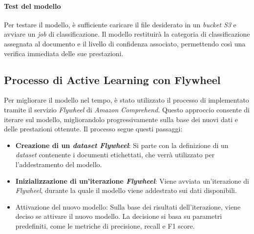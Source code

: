 \paragraph*{Test del modello}
Per testare il modello, è sufficiente caricare il file desiderato in un \emph{bucket S3} e avviare un \emph{job} di classificazione. Il modello restituirà la categoria di classificazione assegnata al documento e il livello di confidenza associato, permettendo così una verifica immediata delle sue prestazioni.

\subsection{Processo di Active Learning con Flywheel}
Per migliorare il modello nel tempo, è stato utilizzato il processo di  implementato tramite il servizio \emph{Flywheel} di \emph{Amazon Comprehend}. Questo approccio consente di iterare sul modello, migliorandolo progressivamente sulla base dei nuovi dati e delle prestazioni ottenute. Il processo segue questi passaggi:

\begin{itemize}
    \item \textbf{Creazione di un \emph{dataset Flywheel}}: Si parte con la definizione di un \emph{dataset} contenente i documenti etichettati, che verrà utilizzato per l'addestramento del modello.
    \item \textbf{Inizializzazione di un'iterazione \emph{Flywheel}}: Viene avviata un'iterazione di \emph{Flywheel}, durante la quale il modello viene addestrato sui dati disponibili.
    \item Attivazione del nuovo modello: Sulla base dei risultati dell'iterazione, viene deciso se attivare il nuovo modello. La decisione si basa su parametri predefiniti, come le metriche di precisione, recall e F1 score.
\end{itemize}

